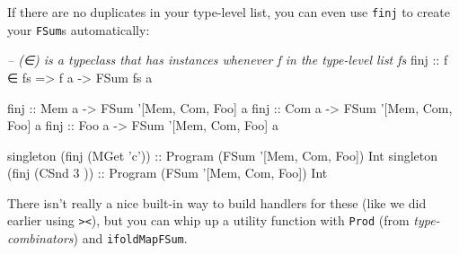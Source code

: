 \documentclass[]{article}
\newenvironment{Shaded}{}{}
\newcommand{\CharTok}[1]{\textcolor[rgb]{0.25,0.44,0.63}{#1}}
\newcommand{\CommentTok}[1]{\textcolor[rgb]{0.38,0.63,0.69}{\textit{#1}}}
\newcommand{\DataTypeTok}[1]{\textcolor[rgb]{0.56,0.13,0.00}{#1}}
\newcommand{\DecValTok}[1]{\textcolor[rgb]{0.25,0.63,0.44}{#1}}
\newcommand{\FunctionTok}[1]{\textcolor[rgb]{0.02,0.16,0.49}{#1}}
\newcommand{\KeywordTok}[1]{\textcolor[rgb]{0.00,0.44,0.13}{\textbf{#1}}}
\newcommand{\NormalTok}[1]{#1}
\newcommand{\OtherTok}[1]{\textcolor[rgb]{0.00,0.44,0.13}{#1}}
\begin{document}
If there are no duplicates in your type-level list, you can even use
\texttt{finj} to create your \texttt{FSum}s automatically:

\begin{Shaded}
\begin{Highlighting}[]
\CommentTok{-- (∈) is a typeclass that has instances whenever f in the type-level list fs}
\OtherTok{finj ::}\NormalTok{ f ∈ fs }\OtherTok{=>}\NormalTok{ f a }\OtherTok{->} \DataTypeTok{FSum}\NormalTok{ fs a}

\OtherTok{finj ::} \DataTypeTok{Mem}\NormalTok{ a }\OtherTok{->} \DataTypeTok{FSum}\NormalTok{ '[}\DataTypeTok{Mem}\NormalTok{, }\DataTypeTok{Com}\NormalTok{, }\DataTypeTok{Foo}\NormalTok{] a}
\OtherTok{finj ::} \DataTypeTok{Com}\NormalTok{ a }\OtherTok{->} \DataTypeTok{FSum}\NormalTok{ '[}\DataTypeTok{Mem}\NormalTok{, }\DataTypeTok{Com}\NormalTok{, }\DataTypeTok{Foo}\NormalTok{] a}
\OtherTok{finj ::} \DataTypeTok{Foo}\NormalTok{ a }\OtherTok{->} \DataTypeTok{FSum}\NormalTok{ '[}\DataTypeTok{Mem}\NormalTok{, }\DataTypeTok{Com}\NormalTok{, }\DataTypeTok{Foo}\NormalTok{] a}

\NormalTok{singleton (finj (}\DataTypeTok{MGet} \CharTok{'c'}\NormalTok{))}\OtherTok{ ::} \DataTypeTok{Program}\NormalTok{ (}\DataTypeTok{FSum}\NormalTok{ '[}\DataTypeTok{Mem}\NormalTok{, }\DataTypeTok{Com}\NormalTok{, }\DataTypeTok{Foo}\NormalTok{]) }\DataTypeTok{Int}
\NormalTok{singleton (finj (}\DataTypeTok{CSnd} \DecValTok{3}\NormalTok{  ))}\OtherTok{ ::} \DataTypeTok{Program}\NormalTok{ (}\DataTypeTok{FSum}\NormalTok{ '[}\DataTypeTok{Mem}\NormalTok{, }\DataTypeTok{Com}\NormalTok{, }\DataTypeTok{Foo}\NormalTok{]) }\DataTypeTok{Int}
\end{Highlighting}
\end{Shaded}

There isn't really a nice built-in way to build handlers for these (like we did
earlier using \texttt{\textgreater{}\textbar{}\textless{}}), but you can whip up
a utility function with \texttt{Prod} (from \emph{type-combinators}) and
\texttt{ifoldMapFSum}.

\begin{Shaded}
\end{Shaded}
\end{document}
